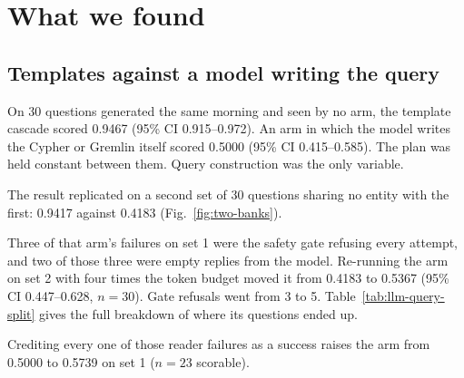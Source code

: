 \section{What we found}

\subsection{Templates against a model writing the query}

On 30 questions generated the same morning and seen by no arm, the template
cascade scored 0.9467 (95\% CI 0.915--0.972). An arm in which the model writes
the Cypher or Gremlin itself scored 0.5000 (95\% CI 0.415--0.585). The plan was
held constant between them. Query construction was the only variable.

The result replicated on a second set of 30 questions sharing no entity with the
first: 0.9417 against 0.4183 (Fig.~\ref{fig:two-banks}).


Three of that arm's failures on set 1 were the safety gate refusing every
attempt, and two of those three were empty replies from the model. Re-running
the arm on set 2 with four times the token budget moved it from 0.4183 to
0.5367 (95\% CI 0.447--0.628, $n = 30$). Gate refusals went from 3 to 5.
Table~\ref{tab:llm-query-split} gives the full breakdown of where its questions
ended up.

\begin{table}[htbp]
\caption{Where the query-writing arm's questions ended up, $n = 30$ per column.
The second row counts questions whose query ran and returned rows that our own
evidence reader could not interpret. That reader dispatches on the column
layouts the templates emit, so the failure is ours rather than the model's.
Produced by .}
\label{tab:llm-query-split}
\centering\small

\end{table}

Crediting every one of those reader failures as a success raises the arm from
0.5000 to 0.5739 on set 1 ($n = 23$ scorable).


